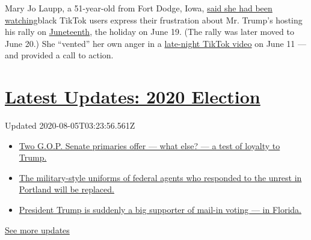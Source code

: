 Mary Jo Laupp, a 51-year-old from Fort Dodge, Iowa,
\href{https://www.dailydot.com/debug/tiktok-challenge-trump-rally/}{said
she had been watching}black TikTok users express their frustration about
Mr. Trump's hosting his rally on
\href{https://www.nytimes.com/interactive/2020/06/18/style/juneteenth-celebration.html}{Juneteenth},
the holiday on June 19. (The rally was later moved to June 20.) She
``vented'' her own anger in a
\href{https://www.tiktok.com/@maryjolaupp/video/6837311838640803078}{late-night
TikTok video} on June 11 --- and provided a call to action.

\hypertarget{latest-updates-2020-election}{%
\section{\texorpdfstring{\href{https://www.nytimes.com/2020/08/04/us/elections/primary-election-michigan-arizona-kansas.html?action=click\&pgtype=Article\&state=default\&region=MAIN_CONTENT_1\&context=storylines_live_updates}{Latest
Updates: 2020
Election}}{Latest Updates: 2020 Election}}\label{latest-updates-2020-election}}

Updated 2020-08-05T03:23:56.561Z

\begin{itemize}
\tightlist
\item
  \href{https://www.nytimes.com/2020/08/04/us/elections/primary-election-michigan-arizona-kansas.html?action=click\&pgtype=Article\&state=default\&region=MAIN_CONTENT_1\&context=storylines_live_updates\#link-3924dd44}{Two
  G.O.P. Senate primaries offer --- what else? --- a test of loyalty to
  Trump.}
\item
  \href{https://www.nytimes.com/2020/08/04/us/elections/primary-election-michigan-arizona-kansas.html?action=click\&pgtype=Article\&state=default\&region=MAIN_CONTENT_1\&context=storylines_live_updates\#link-62a8e06b}{The
  military-style uniforms of federal agents who responded to the unrest
  in Portland will be replaced.}
\item
  \href{https://www.nytimes.com/2020/08/04/us/elections/primary-election-michigan-arizona-kansas.html?action=click\&pgtype=Article\&state=default\&region=MAIN_CONTENT_1\&context=storylines_live_updates\#link-32b39e33}{President
  Trump is suddenly a big supporter of mail-in voting --- in Florida.}
\end{itemize}

\href{https://www.nytimes.com/2020/08/04/us/elections/primary-election-michigan-arizona-kansas.html?action=click\&pgtype=Article\&state=default\&region=MAIN_CONTENT_1\&context=storylines_live_updates}{See
more updates}

